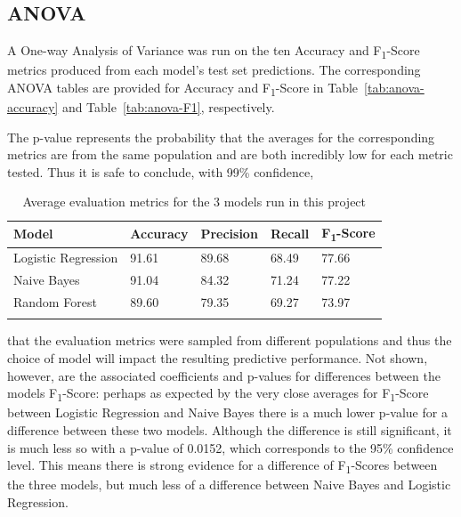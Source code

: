 \documentclass[12pt,letterpaper, oneside]
{article}
\begin{document}
\subsection{ANOVA}
A One-way Analysis of Variance was run on the ten Accuracy and F\textsubscript{1}-Score metrics produced from each model's test set predictions. The corresponding ANOVA tables are provided for Accuracy and F\textsubscript{1}-Score in Table~\ref{tab:anova-accuracy} and Table~\ref{tab:anova-F1}, respectively.

The p-value represents the probability that the averages for the corresponding metrics are from the same population and are both incredibly low for each metric tested. Thus it is safe to conclude, with 99\% confidence,

\begin{table}
	\begin{tabular}{l l l l l} \toprule
		Model & Accuracy & Precision & Recall & F\textsubscript{1}-Score \\ \midrule
		Logistic Regression & 91.61 & 89.68 & 68.49 & 77.66 \\
		Naive Bayes & 91.04 & 84.32 & 71.24 & 77.22 \\
		Random Forest & 89.60 & 79.35 & 69.27 & 73.97 \\
		\caption{Average evaluation metrics for the 3 models run in this project
			\label{tab:3model-ave}
		}
	\end{tabular}

\end{table}

\noindent that the evaluation metrics were sampled from different populations and thus the choice of model will impact the resulting predictive performance. Not shown, however, are the associated coefficients and p-values for differences between the models F\textsubscript{1}-Score: perhaps as expected by the very close averages for F\textsubscript{1}-Score between Logistic Regression and Naive Bayes there is a much lower p-value for a difference between these two models. Although the difference is still significant, it is much less so with a p-value of 0.0152, which corresponds to the 95\% confidence level. This means there is strong evidence for a difference of F\textsubscript{1}-Scores between the three models, but much less of a difference between Naive Bayes and Logistic Regression.

\clearpage
\end{document}
